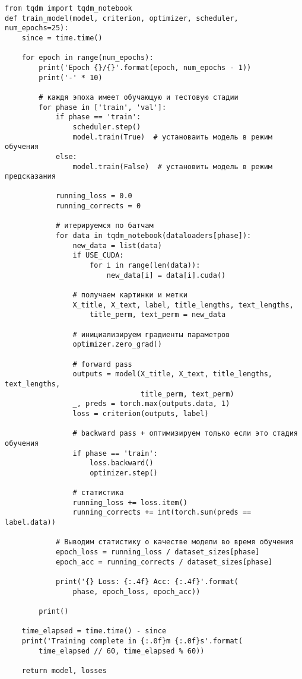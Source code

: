 \begin{verbatim}
from tqdm import tqdm_notebook
def train_model(model, criterion, optimizer, scheduler, num_epochs=25):
    since = time.time()

    for epoch in range(num_epochs):
        print('Epoch {}/{}'.format(epoch, num_epochs - 1))
        print('-' * 10)

        # каждя эпоха имеет обучающую и тестовую стадии
        for phase in ['train', 'val']:
            if phase == 'train':
                scheduler.step()
                model.train(True)  # установаить модель в режим обучения
            else:
                model.train(False)  # установить модель в режим предсказания

            running_loss = 0.0
            running_corrects = 0

            # итерируемся по батчам
            for data in tqdm_notebook(dataloaders[phase]):
                new_data = list(data)
                if USE_CUDA:
                    for i in range(len(data)):
                        new_data[i] = data[i].cuda()
                    
                # получаем картинки и метки
                X_title, X_text, label, title_lengths, text_lengths, 
                    title_perm, text_perm = new_data
                
                # инициализируем градиенты параметров
                optimizer.zero_grad()

                # forward pass
                outputs = model(X_title, X_text, title_lengths, text_lengths, 
                                title_perm, text_perm)
                _, preds = torch.max(outputs.data, 1)
                loss = criterion(outputs, label)

                # backward pass + оптимизируем только если это стадия обучения
                if phase == 'train':
                    loss.backward()
                    optimizer.step()

                # статистика
                running_loss += loss.item()
                running_corrects += int(torch.sum(preds == label.data))

            # Выводим статистику о качестве модели во время обучения
            epoch_loss = running_loss / dataset_sizes[phase]
            epoch_acc = running_corrects / dataset_sizes[phase]
            
            print('{} Loss: {:.4f} Acc: {:.4f}'.format(
                phase, epoch_loss, epoch_acc))

        print()

    time_elapsed = time.time() - since
    print('Training complete in {:.0f}m {:.0f}s'.format(
        time_elapsed // 60, time_elapsed % 60))

    return model, losses
\end{verbatim}

